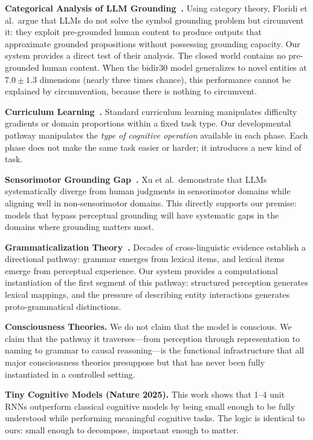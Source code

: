 \documentclass{article}
\begin{document}
\textbf{Categorical Analysis of LLM Grounding~\citep{floridi2025}.} Using category theory, Floridi et al.\ argue that LLMs do not solve the symbol grounding problem but circumvent it: they exploit pre-grounded human content to produce outputs that approximate grounded propositions without possessing grounding capacity. Our system provides a direct test of their analysis. The closed world contains no pre-grounded human content. When the bidir30 model generalizes to novel entities at $7.0 \pm 1.3$ dimensions (nearly three times chance), this performance cannot be explained by circumvention, because there is nothing to circumvent.

\textbf{Curriculum Learning~\citep{bengio2009}.} Standard curriculum learning manipulates difficulty gradients or domain proportions within a fixed task type. Our developmental pathway manipulates the \emph{type of cognitive operation} available in each phase. Each phase does not make the same task easier or harder; it introduces a new kind of task.

\textbf{Sensorimotor Grounding Gap~\citep{xu2025}.} Xu et al.\ demonstrate that LLMs systematically diverge from human judgments in sensorimotor domains while aligning well in non-sensorimotor domains. This directly supports our premise: models that bypass perceptual grounding will have systematic gaps in the domains where grounding matters most.

\textbf{Grammaticalization Theory~\citep{heine2002,traugott2002,bybee2010}.} Decades of cross-linguistic evidence establish a directional pathway: grammar emerges from lexical items, and lexical items emerge from perceptual experience. Our system provides a computational instantiation of the first segment of this pathway: structured perception generates lexical mappings, and the pressure of describing entity interactions generates proto-grammatical distinctions.

\textbf{Consciousness Theories.} We do not claim that the model is conscious. We claim that the pathway it traverses---from perception through representation to naming to grammar to causal reasoning---is the functional infrastructure that all major consciousness theories presuppose but that has never been fully instantiated in a controlled setting.

\textbf{Tiny Cognitive Models (Nature 2025).} This work shows that 1--4 unit RNNs outperform classical cognitive models by being small enough to be fully understood while performing meaningful cognitive tasks. The logic is identical to ours: small enough to decompose, important enough to matter.
\end{document}
